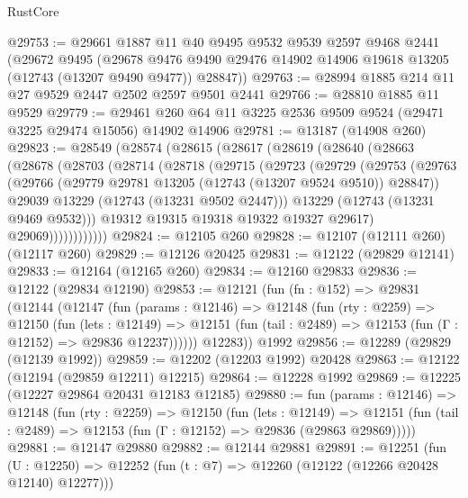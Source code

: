 \begin{lexlean}{RustCore}
\begin{coremodule}
@29753 := @29661
    @1887
    @11
    @40
    @9495
    @9532
    @9539
    @2597
    @9468
    @2441
    (@29672
      @9495
      (@29678 @9476 @9490 @29476 @14902 @14906 @19618 @13205 (@12743 (@13207 @9490 @9477)) @28847))
@29763 := @28994 @1885 @214 @11 @27 @9529 @2447 @2502 @2597 @9501 @2441
@29766 := @28810 @1885 @11 @9529
@29779 := @29461 @260 @64 @11 @3225 @2536 @9509 @9524 (@29471 @3225 @29474 @15056) @14902 @14906
@29781 := @13187 (@14908 @260)
@29823 := @28549
    (@28574
      (@28615
        (@28617
          (@28619
            (@28640
              (@28663
                (@28678
                  (@28703
                    (@28714
                      (@28718
                        (@29715
                          (@29723
                            (@29729
                              (@29753
                                (@29763
                                  (@29766
                                    (@29779 @29781 @13205 (@12743 (@13207 @9524 @9510)) @28847))
                                  @29039
                                  @13229
                                  (@12743 (@13231 @9502 @2447)))
                                @13229
                                (@12743 (@13231 @9469 @9532)))
                              @19312
                              @19315
                              @19318
                              @19322
                              @19327
                              @29617)
                            @29069))))))))))))
@29824 := @12105 @260
@29828 := @12107 (@12111 @260) (@12117 @260)
@29829 := @12126 @20425
@29831 := @12122 (@29829 @12141)
@29833 := @12164 (@12165 @260)
@29834 := @12160 @29833
@29836 := @12122 (@29834 @12190)
@29853 := @12121
    (fun (fn : @152) =>
    @29831
      (@12144
        (@12147
          (fun (params : @12146) =>
          @12148
            (fun (rty : @2259) =>
            @12150
              (fun (lets : @12149) =>
              @12151 (fun (tail : @2489) => @12153 (fun (Γ : @12152) => @29836 @12237))))))
        @12283))
    @1992
@29856 := @12289 (@29829 (@12139 @1992))
@29859 := @12202 (@12203 @1992) @20428
@29863 := @12122 (@12194 (@29859 @12211) @12215)
@29864 := @12228 @1992
@29869 := @12225 (@12227 @29864 @20431 @12183 @12185)
@29880 := fun (params : @12146) =>
  @12148
    (fun (rty : @2259) =>
    @12150
      (fun (lets : @12149) =>
      @12151 (fun (tail : @2489) => @12153 (fun (Γ : @12152) => @29836 (@29863 @29869)))))
@29881 := @12147 @29880
@29882 := @12144 @29881
@29891 := @12251
    (fun (U : @12250) => @12252 (fun (t : @7) => @12260 (@12122 (@12266 @20428 @12140) @12277)))

\end{coremodule}
\end{lexlean}
